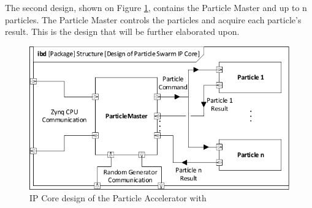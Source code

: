 \clearpage

The second design, shown on Figure \ref{fig:ibdpsosarchitecture1}, contains the Particle Master and up to n particles. The Particle Master controls the particles and acquire each particle's result. This is the design that will be further elaborated upon.

\begin{figure}[H]
	\centering
	\includegraphics[width=0.7\linewidth]{diagram/ibd_psos_architecture1}
	\caption{IP Core design of the Particle Accelerator with }
	\label{fig:ibdpsosarchitecture1}
\end{figure}




